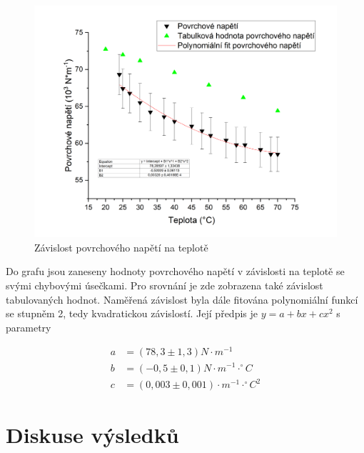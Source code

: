 \begin{figure}[h]
    \centering
    \includegraphics[width=1\linewidth]{14 - Studium teplotní závislosti povrchového napětí/Protokol - studium povrchového napětí/img/Závislost povrchového napětí na teplotě.png}
    \caption{Závislost povrchového napětí na teplotě}
    \label{fig:napeti-na-teplote}
\end{figure}

\newpage

Do grafu jsou zaneseny hodnoty povrchového napětí v závislosti na teplotě se svými chybovými úsečkami. Pro srovnání je zde zobrazena také závislost tabulovaných hodnot. Naměřená závislost byla dále fitována polynomiální funkcí se stupněm 2, tedy kvadratickou závislostí. Její předpis je $y = a + bx + cx^2$ s parametry

\begin{align*}
    a &= (78,3 \pm 1,3) N \cdot m^{-1}\\
    b &= (-0,5 \pm 0,1) N \cdot m^{-1} \cdot ^\circ C\\
    c &= (0,003 \pm 0,001) \cdot m^{-1} \cdot ^\circ C^2
\end{align*}



\section{Diskuse výsledků}

